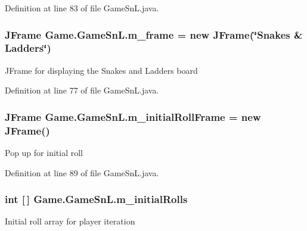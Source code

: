 Definition at line 83 of file Game\+Sn\+L.\+java.

\hypertarget{class_game_1_1_game_sn_l_a694cff89aec27b85a6b970b2304c6968}{}
\subsubsection[{m\+\_\+frame}]{\setlength{\rightskip}{0pt plus 5cm}J\+Frame Game.\+Game\+Sn\+L.\+m\+\_\+frame = new J\+Frame(\char`\"{}Snakes \& Ladders\char`\"{})\hspace{0.3cm}{\ttfamily [private]}}\label{class_game_1_1_game_sn_l_a694cff89aec27b85a6b970b2304c6968}
J\+Frame for displaying the Snakes and Ladders board 

Definition at line 77 of file Game\+Sn\+L.\+java.

\hypertarget{class_game_1_1_game_sn_l_ae665665dd40de7d795777635000da8eb}{}
\subsubsection[{m\+\_\+initial\+Roll\+Frame}]{\setlength{\rightskip}{0pt plus 5cm}J\+Frame Game.\+Game\+Sn\+L.\+m\+\_\+initial\+Roll\+Frame = new J\+Frame()\hspace{0.3cm}{\ttfamily [private]}}\label{class_game_1_1_game_sn_l_ae665665dd40de7d795777635000da8eb}
Pop up for initial roll 

Definition at line 89 of file Game\+Sn\+L.\+java.

\hypertarget{class_game_1_1_game_sn_l_a005ffc3118d467caff14a7afdc68a520}{}
\subsubsection[{m\+\_\+initial\+Rolls}]{\setlength{\rightskip}{0pt plus 5cm}int \mbox{[}$\,$\mbox{]} Game.\+Game\+Sn\+L.\+m\+\_\+initial\+Rolls\hspace{0.3cm}{\ttfamily [private]}}\label{class_game_1_1_game_sn_l_a005ffc3118d467caff14a7afdc68a520}
Initial roll array for player iteration 

